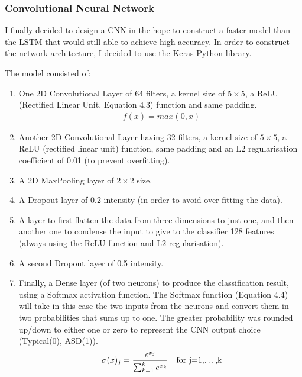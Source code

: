 \subsubsection{Convolutional Neural Network}
I finally decided to design a CNN in the hope to construct a faster model than the LSTM that would still able to achieve high accuracy. In order to construct the network architecture, I decided to use the Keras Python library. 

The model consisted of: 
\begin{enumerate}
\itemsep0em
\item One 2D Convolutional Layer of 64 filters, a kernel size of $5\times5$, a ReLU (Rectified Linear Unit, Equation 4.3) function and same padding. 
\useshortskip
\begin{align}
\ f(x) = max(0,x)
\label{eq:3}
\end{align}
\useshortskip
\item Another 2D Convolutional Layer having 32 filters, a kernel size of $5\times5$, a ReLU (rectified linear unit) function, same padding and an L2 regularisation coefficient of 0.01 (to prevent overfitting). 
\item A 2D MaxPooling layer of $2\times2$ size.
\item A Dropout layer of 0.2 intensity (in order to avoid over-fitting the data).
\item A layer to first flatten the data from three dimensions to just one, and then another one to condense the input to give to the classifier 128 features (always using the ReLU function and L2 regularisation).
\item A second Dropout layer of 0.5 intensity.
\item Finally, a Dense layer (of two neurons) to produce the classification result, using a Softmax activation function. The Softmax function (Equation 4.4) will take in this case the two inputs from the neurons and convert them in two probabilities that sums up to one. The greater probability was rounded up/down to either one or zero to represent the CNN output choice (Typical(0), ASD(1)).
\begin{align}
\ \sigma(x)_{j} = \frac{e^{x_{j}}}{\sum_{k=1}^{k} e^{x_{k}}} && \text{for j=1,\dots,k}
\label{eq:3}
\end{align}
\end{enumerate}

